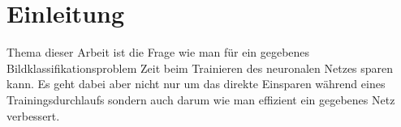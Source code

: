 \chapter{Einleitung}
\label{sec:EinleitungGesamt}

Thema dieser Arbeit ist die Frage wie man für ein gegebenes Bildklassifikationsproblem Zeit beim Trainieren des neuronalen Netzes sparen kann. Es geht dabei aber nicht nur um das direkte Einsparen während eines Trainingsdurchlaufs sondern auch darum wie man effizient ein gegebenes Netz verbessert.
